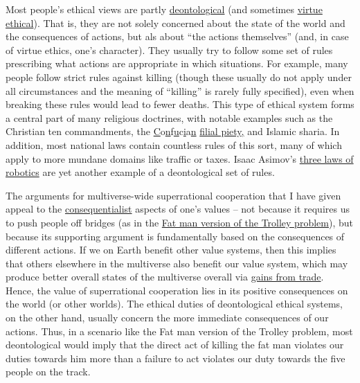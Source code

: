 Most people's ethical views are partly
\href{https://en.wikipedia.org/wiki/Deontological_ethics}{deontological}
(and sometimes
\href{https://en.wikipedia.org/wiki/Virtue_ethics}{virtue
ethical}). That is, they are not solely concerned about the state of
the world and the consequences of actions, but als about ``the actions
themselves'' (and, in case of virtue ethics, one's character). They
usually try to follow some set of rules prescribing what actions are
appropriate in which situations. For example, many people follow strict
rules against killing (though these usually do not apply under all
circumstances and the meaning of ``killing'' is rarely fully specified),
even when breaking these rules would lead to fewer deaths. This type of
ethical system forms a central part of many religious doctrines, with
notable examples such as the Christian ten commandments, the
\href{https://en.wikipedia.org/wiki/Ten_Commandments}{C}o\href{https://en.wikipedia.org/wiki/Ten_Commandments}{n}f\href{https://en.wikipedia.org/wiki/Ten_Commandments}{u}c\href{https://en.wikipedia.org/wiki/Ten_Commandments}{i}a\href{https://en.wikipedia.org/wiki/Ten_Commandments}{n}
\href{https://en.wikipedia.org/wiki/Filial_piety}{filial
piety}\href{https://en.wikipedia.org/wiki/Ten_Commandments}{,} and
Islamic sharia. In addition, most national laws contain countless rules
of this sort, many of which apply to more mundane domains like traffic
or taxes. Isaac Asimov's
\href{https://en.wikipedia.org/wiki/Three_Laws_of_Robotics}{three
laws of robotics} are yet another example of a deontological set of
rules.

The arguments for multiverse-wide superrational cooperation that I have
given appeal to the
\href{https://en.wikipedia.org/wiki/Consequentialism}{consequentialist}
aspects of one's values -- not because it requires us to push people off
bridges (as in the
\href{https://en.wikipedia.org/wiki/Trolley_problem\#The_fat_man}{Fat
man version of the Trolley problem}), but because its supporting
argument is fundamentally based on the consequences of different
actions. If we on Earth benefit other value systems, then this implies
that others elsewhere in the multiverse also benefit our value system,
which may produce better overall states of the multiverse overall via
\href{https://foundational-research.org/gains-from-trade-through-compromise/}{gains
from trade}. Hence, the value of superrational cooperation lies in its
positive consequences on the world (or other worlds). The ethical duties
of deontological ethical systems, on the other hand, usually concern the
more immediate consequences of our actions. Thus, in a scenario like the
Fat man version of the Trolley problem, most deontological would imply
that the direct act of killing the fat man violates our duties towards
him more than a failure to act violates our duty towards the five people
on the track.

